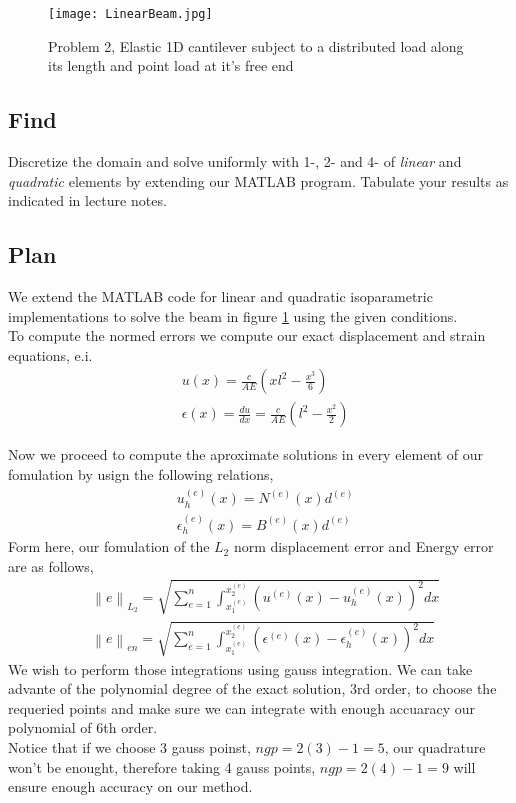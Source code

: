 \documentclass[a4paper]{memoir}
\begin{document}
\begin{figure}
	\centering
		\texttt{[image: LinearBeam.jpg]}
	\caption{Problem 2, Elastic 1D cantilever subject to a distributed load along its length and point load at it's free end}
	\label{fig:Loaded_beam}
\end{figure}

\subsection{Find}
Discretize the domain and solve uniformly with 1-, 2- and 4- of \textit{linear} and \textit{quadratic} elements by extending our MATLAB program. Tabulate your results as indicated in lecture notes.

\subsection{Plan}
We extend the MATLAB code for linear and quadratic isoparametric implementations to solve the beam in figure \ref{fig:Loaded_beam} using the given conditions. \\

To compute the normed errors we compute our exact displacement and strain equations, e.i.
\begin{align*}
	& u(x) = \frac{c}{AE} \left( xl^2 -\frac{x^3}{6} \right) \\
	& \epsilon(x) = \frac{du}{dx} = \frac{c}{AE} \left( l^2 -\frac{x^2}{2} \right) 
\end{align*}

Now we proceed to compute the aproximate solutions in every element of our fomulation by usign the following relations,
\begin{align*}
	& u_h^{(e)}(x) =  N^{(e)}(x) d^{(e)}\\
	& \epsilon_h^{(e)}(x) = B^{(e)}(x) d^{(e)}
\end{align*}
Form here, our fomulation of the $L_2$ norm displacement error and Energy error are as follows,
\begin{align*}
	& \left\|e \right\|_{L_2} = \sqrt{\sum_{e=1}^{n} \int_{x_1^{(e)}}^{x_2^{(e)}}\left(u^{(e)}(x)-u_h^{(e)}(x)\right)^2 dx} \\
	& \left\|e \right\|_{en} = \sqrt{\sum_{e=1}^{n} \int_{x_1^{(e)}}^{x_2^{(e)}}\left(\epsilon^{(e)}(x)-\epsilon_h^{(e)}(x)\right)^2 dx}
\end{align*}
We wish to perform those integrations using gauss integration. We can take advante of the polynomial degree of the exact solution, 3rd order, to choose the requeried points and make sure we can integrate with enough accuaracy our polynomial of 6th order. \\
Notice that if we choose 3 gauss poinst, $ngp = 2(3)-1 = 5$, our quadrature won't be enought, therefore taking 4 gauss points, $ngp = 2(4)-1 = 9$ will ensure enough accuracy on our method. \\
\end{document}
